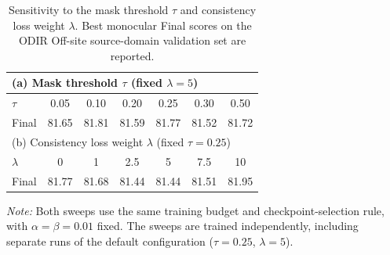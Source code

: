 \documentclass[a4paper,fleqn]{cas-sc}
\begin{document}
\pagestyle{empty}
\setcounter{table}{1}
\begin{table}[pos=H]
\centering
\caption{Sensitivity to the mask threshold $\tau$ and consistency loss weight $\lambda$. Best monocular Final scores on the ODIR Off-site source-domain validation set are reported.}
\begin{tabular}{lcccccc}
\toprule
\multicolumn{7}{l}{(a) Mask threshold $\tau$ (fixed $\lambda=5$)} \\
\midrule
$\tau$ & 0.05 & 0.10 & 0.20 & 0.25 & 0.30 & 0.50 \\
Final & 81.65 & 81.81 & 81.59 & 81.77 & 81.52 & 81.72 \\
\midrule
\multicolumn{7}{l}{(b) Consistency loss weight $\lambda$ (fixed $\tau=0.25$)} \\
\midrule
$\lambda$ & 0 & 1 & 2.5 & 5 & 7.5 & 10 \\
Final & 81.77 & 81.68 & 81.44 & 81.44 & 81.51 & 81.95 \\
\bottomrule
\end{tabular}
\par\vspace{4pt}
\begin{minipage}{\linewidth}
\footnotesize
\textit{Note:} Both sweeps use the same training budget and checkpoint-selection rule, with $\alpha=\beta=0.01$ fixed. The sweeps are trained independently, including separate runs of the default configuration ($\tau=0.25$, $\lambda=5$).
\end{minipage}
\end{table}
\end{document}
